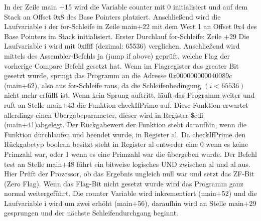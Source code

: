 \documentclass[12pt]{article}
\begin{document}
In der Zeile main +15 wird die Variable counter mit 0 initialisiert und auf dem Stack an Offset 0x8 des Base Pointers platziert. 
Anschließend wird die Laufvariable i der for-Schleife in Zeile main+22 mit dem Wert 1 an Offset 0x4 des Base Pointers im Stack initialisiert.
Erster Durchlauf for-Schleife: Zeile +29 Die Laufvariable i wird mit 0xffff (dezimal: 65536) verglichen. Anschließend wird mittels des Assembler-Befehls ja (jump if above) geprüft, welche Flag der vorherige Compare Befehl gesetzt hat. Wenn im Flagregister das greater Bit gesetzt wurde, springt das Programm an die Adresse $0x000000000040089c$ (main+62), also aus for-Schleife raus, da die Schleifenbedingung $(i<65536)$ nicht mehr erfüllt ist. Wenn kein Sprung auftritt, läuft das Programm weiter und ruft an Stelle main+43 die Funktion checkIfPrime auf. Diese Funktion erwartet allerdings einen Übergabeparameter, dieser wird in Register \$edi (main+41)abgelegt. 
Der Rückgabewert der Funktion steht daraufhin, wenn die Funktion durchlaufen und beendet wurde, in Register al. Da checkIfPrime den Rückgabetyp boolean besitzt steht in Register al entweder eine 0 wenn es keine Primzahl war, oder 1 wenn es eine Primzahl war die übergeben wurde. Der Befehl test an Stelle main+48 führt ein bitweise logisches UND zwischen al und al aus. Hier Prüft der Prozessor, ob das Ergebnis ungleich null war und setzt das ZF-Bit (Zero Flag). Wenn das Flag-Bit nicht gesetzt wurde wird das Programm ganz normal weitergeführt. Die counter Variable wird inkrementiert (main+52) und die Laufvariable i wird um zwei erhöht (main+56), daraufhin wird an Stelle main+29 gesprungen und der nächste Schleifendurchgang beginnt.
\end{document}
